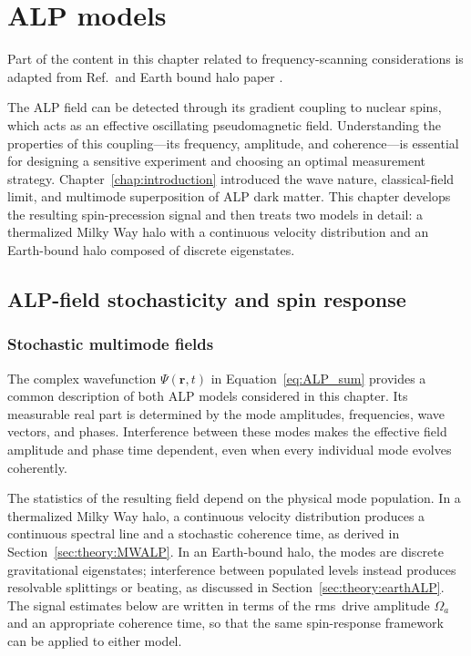 \chapter{ALP models}\label{chap:theory}
\begin{jointwork}
    Part of the content in this chapter related to frequency-scanning considerations is adapted from Ref.\,\cite{Yuzhe2023_FrequencyScanning} and Earth bound halo paper .
\end{jointwork}

The ALP field can be detected through its gradient coupling to nuclear spins, which acts as an effective oscillating pseudomagnetic field.
Understanding the properties of this coupling---its frequency, amplitude, and coherence---is essential for designing a sensitive experiment and choosing an optimal measurement strategy.
Chapter~\ref{chap:introduction} introduced the wave nature, classical-field limit, and multimode superposition of ALP dark matter.
This chapter develops the resulting spin-precession signal and then treats two models in detail: a thermalized Milky Way halo with a continuous velocity distribution and an Earth-bound halo composed of discrete eigenstates.


\section{ALP-field stochasticity and spin response}\label{sec:theory:ALPfield}

\subsection{Stochastic multimode fields}\label{sec:theory:stochasticity}

The complex wavefunction $\Psi(\boldsymbol{r},t)$ in Equation~\eqref{eq:ALP_sum} provides a common description of both ALP models considered in this chapter.
Its measurable real part is determined by the mode amplitudes, frequencies, wave vectors, and phases.
Interference between these modes makes the effective field amplitude and phase time dependent, even when every individual mode evolves coherently.

The statistics of the resulting field depend on the physical mode population.
In a thermalized Milky Way halo, a continuous velocity distribution produces a continuous spectral line and a stochastic coherence time, as derived in Section~\ref{sec:theory:MWALP}.
In an Earth-bound halo, the modes are discrete gravitational eigenstates; interference between populated levels instead produces resolvable splittings or beating, as discussed in Section~\ref{sec:theory:earthALP}.
The signal estimates below are written in terms of the rms\ drive amplitude $\Omega_a$ and an appropriate coherence time, so that the same spin-response framework can be applied to either model.


